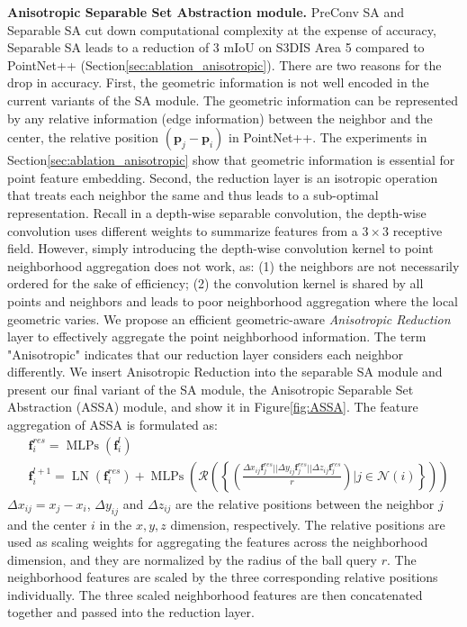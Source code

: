 \documentclass{article}
\newcommand{\figLabel}{Figure\xspace}
\newcommand{\secLabel}{Section\xspace}
\newcommand{\mysection}[1]{\vspace{3pt}\noindent\textbf{#1.}}
\begin{document}
\mysection{Anisotropic Separable Set Abstraction module}
PreConv SA and Separable SA cut down computational complexity at the expense of accuracy, \eg Separable SA leads to a reduction of $3$ mIoU on S3DIS Area 5 compared to PointNet++ (\secLabel \ref{sec:ablation_anisotropic}).
There are two reasons for the  drop in accuracy. First, the geometric information is not well encoded in the current variants of the SA module. The geometric information can be represented by any relative information (edge information) between the neighbor and the center, \eg the relative position $(\mathbf{p}_j - \mathbf{p}_i)$ in PointNet++. The experiments in \secLabel \ref{sec:ablation_anisotropic} show that geometric information is essential for point feature embedding. 
Second, the reduction layer is an isotropic operation that treats each neighbor the same and thus leads to a sub-optimal representation. Recall in a depth-wise separable convolution, the depth-wise convolution uses different weights to summarize features from a $3\times3$ receptive field. However, simply introducing the depth-wise convolution kernel to point neighborhood aggregation does not work, as: (1) the neighbors are not necessarily ordered for the sake of efficiency; (2) the convolution kernel is shared by all points and neighbors and leads to poor neighborhood aggregation where the local geometric varies.
We propose an efficient geometric-aware \textit{Anisotropic Reduction} layer to effectively aggregate the point neighborhood information. The term "Anisotropic" indicates that our reduction layer considers each neighbor differently. We insert Anisotropic Reduction into the separable SA module and present our final variant of the SA module, the Anisotropic Separable Set Abstraction (ASSA) module, and show it in \figLabel \ref{fig:ASSA}. The feature aggregation of ASSA is formulated as:
\begin{equation}\label{eqn:assa}
\begin{split}
& \mathbf{f}_i^{res} =\operatorname{MLPs}(\mathbf{f}_i^l)\\
& \mathbf{f}_i^{l+1} =\operatorname{LN}\left(\mathbf{f}_i^{res}\right) + 
\operatorname{MLPs}\left(\mathcal{R}\left(\left\{\left(\frac{\Delta x_{i j}\mathbf{f}_j^{res} || \Delta y_{i j}\mathbf{f}_j^{res} || \Delta z_{i j}\mathbf{f}_j^{res}}{r} \right)|j\in \mathcal{N}(i)\right\}\right)\right)
\end{split}
\end{equation}
$\Delta x_{i j} = x_j - x_i$, $\Delta y_{i j}$ and $\Delta z_{i j}$ are the relative positions between the neighbor $j$ and the center $i$ in the $x, y, z$ dimension, respectively. The relative positions are used as scaling weights for aggregating the features across the neighborhood dimension, and they are normalized by the radius of the ball query $r$. The neighborhood features are scaled by the three corresponding relative positions individually. The three scaled neighborhood features are then concatenated together and passed into the reduction layer.
\end{document}
